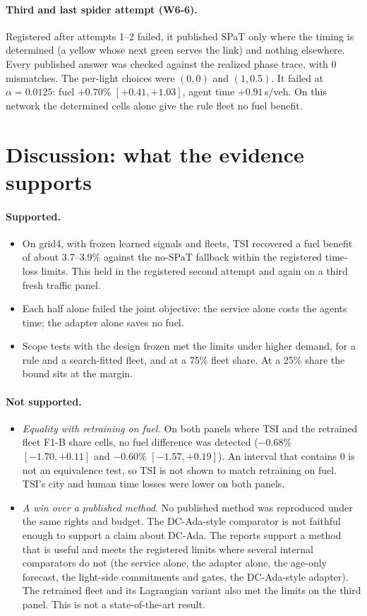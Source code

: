 \documentclass[11pt]{article}
\begin{document}
\paragraph{Third and last spider attempt (W6-6).} Registered after attempts 1--2 failed, it published SPaT only where the timing is
determined (a yellow whose next green serves the link) and nothing elsewhere. Every published answer was checked against the realized
phase trace, with 0 mismatches. The per-light choices were $(0,0)$ and $(1,0.5)$. It failed at $\alpha=0.0125$: fuel $+0.70\%$
$[+0.41,+1.03]$, agent time $+0.91$\,s/veh. On this network the determined cells alone give the rule fleet no fuel benefit.

\section{Discussion: what the evidence supports}\label{sec:discussion}
\paragraph{Supported.}
\begin{itemize}\setlength\itemsep{0pt}
\item On grid4, with frozen learned signals and fleets, TSI recovered a fuel benefit of about 3.7--3.9\% against the no-SPaT fallback within
the registered time-loss limits. This held in the registered second attempt and again on a third fresh traffic panel.
\item Each half alone failed the joint objective: the service alone costs the agents time; the adapter alone saves no fuel.
\item Scope tests with the design frozen met the limits under higher demand, for a rule and a search-fitted fleet, and at a 75\% fleet
share. At a 25\% share the bound sits at the margin.
\end{itemize}
\paragraph{Not supported.}
\begin{itemize}\setlength\itemsep{0pt}
\item \emph{Equality with retraining on fuel.} On both panels where TSI and the retrained fleet F1-B share cells, no fuel difference was
detected ($-0.68\%$ $[-1.70,+0.11]$ and $-0.60\%$ $[-1.57,+0.19]$). An interval that contains 0 is not an equivalence test, so TSI is not
shown to match retraining on fuel. TSI's city and human time losses were lower on both panels.
\item \emph{A win over a published method.} No published method was reproduced under the same rights and budget. The DC-Ada-style
comparator is not faithful enough to support a claim about DC-Ada. The reports support a method that is useful and meets the registered limits where several
internal comparators do not (the service alone, the adapter alone, the age-only forecast, the light-side commitments and gates, the
DC-Ada-style adapter). The retrained fleet and its Lagrangian variant also met the limits on the third panel. This is not a
state-of-the-art result.
\end{itemize}
\end{document}
